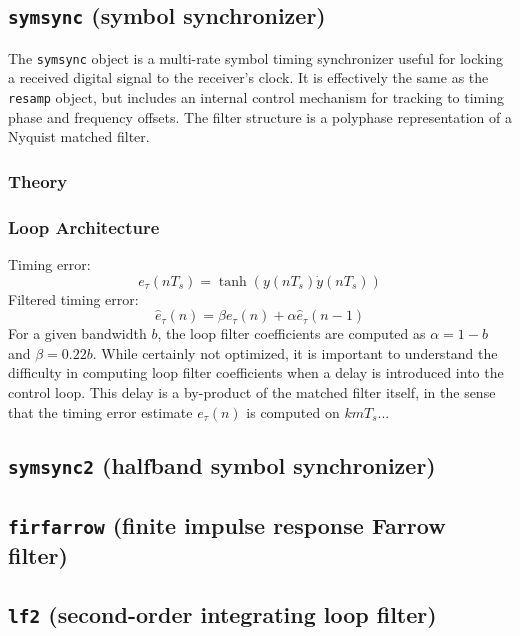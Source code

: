 \subsection{{\tt symsync} (symbol synchronizer)}
The {\tt symsync} object is a multi-rate symbol timing synchronizer useful for
locking a received digital signal to the receiver's clock.
It is effectively the same as the {\tt resamp} object, but includes an
internal control mechanism for tracking to timing phase and frequency offsets.
The filter structure is a polyphase representation of a Nyquist matched
filter.

\subsubsection{Theory}

\subsubsection{Loop Architecture}
Timing error:
\[
    e_\tau(nT_s) = \tanh\left( y(nT_s)\dot{y}(nT_s) \right)
\]
Filtered timing error:
\[
    \hat{e}_\tau(n) = \beta e_\tau(n) + \alpha \hat{e}_\tau(n-1)
\]
For a given bandwidth $b$, the loop filter coefficients are computed as
$\alpha = 1-b$ and $\beta = 0.22b$.
While certainly not optimized, it is important to understand the difficulty in
computing loop filter coefficients when a delay is introduced into the control
loop.
This delay is a by-product of the matched filter itself, in the sense that the
timing error estimate $e_\tau(n)$ is computed on $k m T_s$...

\subsection{{\tt symsync2} (halfband symbol synchronizer)}

\subsection{{\tt firfarrow} (finite impulse response Farrow filter)}

\subsection{{\tt lf2} (second-order integrating loop filter)}

